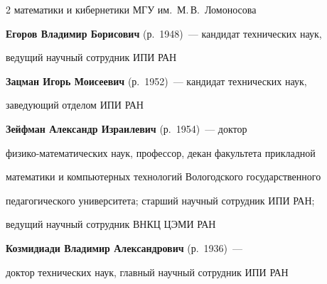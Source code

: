 \begin{multicols}{2}
математики и кибернетики МГУ им.\ М.\,В.~Ломоносова



\medskip%



\noindent %

\textbf{Егоров Владимир Борисович} (р.\ 1948)~---  кандидат технических наук,

ведущий научный сотрудник   ИПИ РАН



\medskip%



\noindent

\textbf{Зацман Игорь Моисеевич} (р.\ 1952)~---   кандидат технических наук, 

заведующий отделом ИПИ РАН



\medskip%



\noindent

\textbf{Зейфман Александр Израилевич} (р.\ 1954)~--- доктор

физико-математических наук, профессор, декан факультета прикладной

математики и компьютерных технологий Вологодского государственного

педагогического университета; старший научный сотрудник ИПИ РАН;

ведущий научный сотрудник ВНКЦ ЦЭМИ РАН






\noindent

\textbf{Козмидиади Владимир Александрович} (р.\ 1936)~--- 

доктор технических наук, главный научный сотрудник ИПИ РАН





\medskip%







\end{multicols}

